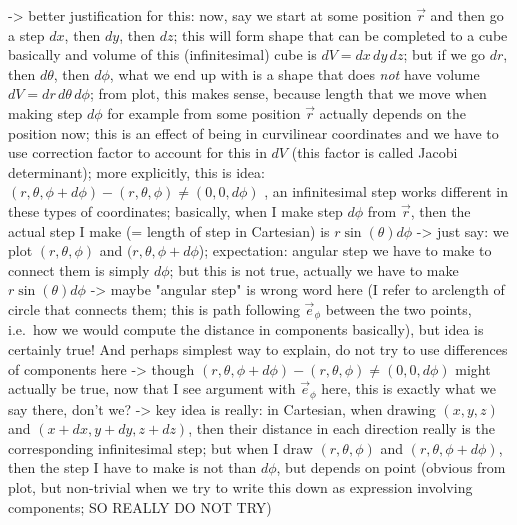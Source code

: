 \documentclass[../class_mech_main.tex]{subfiles}
\begin{document}
-> better justification for this: now, say we start at some position $\vec{r}$ and then go a step $dx$, then $dy$, then $dz$; this will form shape that can be completed to a cube basically and volume of this (infinitesimal) cube is $dV = dx \, dy \, dz$; but if we go $dr$, then $d\theta$, then $d\phi$, what we end up with is a shape that does \emph{not} have volume $dV = dr \, d\theta \, d\phi$; from plot, this makes sense, because length that we move when making step $d\phi$ for example from some position $\vec{r}$ actually depends on the position now; this is an effect of being in curvilinear coordinates and we have to use correction factor to account for this in $dV$ (this factor is called Jacobi determinant); more explicitly, this is idea: $(r, \theta, \phi + d\phi) - (r, \theta, \phi) \neq (0, 0, d\phi)$ , an infinitesimal step works different in these types of coordinates; basically, when I make step $d\phi$ from $\vec{r}$, then the actual step I make (= length of step in Cartesian) is $r \sin(\theta) d\phi$
-> just say: we plot $(r, \theta, \phi)$ and $(r, \theta, \phi + d\phi$); expectation: angular step we have to make to connect them is simply $d\phi$; but this is not true, actually we have to make $r \sin(\theta) d\phi$ -> maybe "angular step" is wrong word here (I refer to arclength of circle that connects them; this is path following $\vec{e}_\phi$ between the two points, i.e.~how we would compute the distance in components basically), but idea is certainly true! And perhaps simplest way to explain, do not try to use differences of components here -> though $(r, \theta, \phi + d\phi) - (r, \theta, \phi) \neq (0, 0, d\phi)$ might actually be true, now that I see argument with $\vec{e}_\phi$ here, this is exactly what we say there, don't we?
-> key idea is really: in Cartesian, when drawing $(x,y,z)$ and $(x+dx,y+dy,z+dz)$, then their distance in each direction really is the corresponding infinitesimal step; but when I draw $(r, \theta, \phi)$ and $(r, \theta, \phi + d\phi)$, then the step I have to make is not than $d\phi$, but depends on point (obvious from plot, but non-trivial when we try to write this down as expression involving components; SO REALLY DO NOT TRY)
\end{document}

